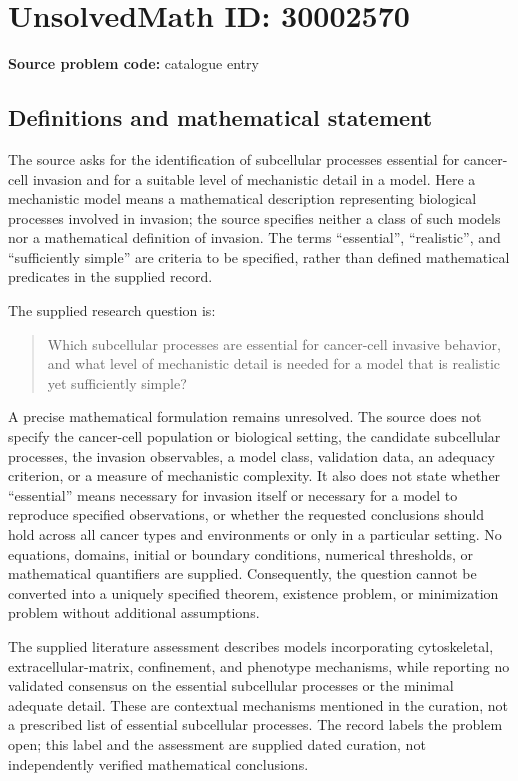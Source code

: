 \documentclass[11pt]{article}
\begin{document}
\section*{UnsolvedMath ID: 30002570}
\textbf{Source problem code:} catalogue entry
\subsection{Definitions and mathematical statement}
The source asks for the identification of subcellular processes essential for cancer-cell invasion and for a suitable level of mechanistic detail in a model. Here a mechanistic model means a mathematical description representing biological processes involved in invasion; the source specifies neither a class of such models nor a mathematical definition of invasion. The terms ``essential'', ``realistic'', and ``sufficiently simple'' are criteria to be specified, rather than defined mathematical predicates in the supplied record.

The supplied research question is:
\begin{quote}
Which subcellular processes are essential for cancer-cell invasive behavior, and what level of mechanistic detail is needed for a model that is realistic yet sufficiently simple?
\end{quote}

A precise mathematical formulation remains unresolved. The source does not specify the cancer-cell population or biological setting, the candidate subcellular processes, the invasion observables, a model class, validation data, an adequacy criterion, or a measure of mechanistic complexity. It also does not state whether ``essential'' means necessary for invasion itself or necessary for a model to reproduce specified observations, or whether the requested conclusions should hold across all cancer types and environments or only in a particular setting. No equations, domains, initial or boundary conditions, numerical thresholds, or mathematical quantifiers are supplied. Consequently, the question cannot be converted into a uniquely specified theorem, existence problem, or minimization problem without additional assumptions.

The supplied literature assessment describes models incorporating cytoskeletal, extracellular-matrix, confinement, and phenotype mechanisms, while reporting no validated consensus on the essential subcellular processes or the minimal adequate detail. These are contextual mechanisms mentioned in the curation, not a prescribed list of essential subcellular processes. The record labels the problem open; this label and the assessment are supplied dated curation, not independently verified mathematical conclusions.
\end{document}
